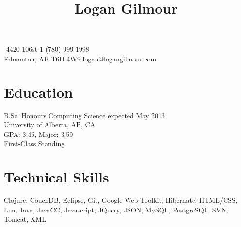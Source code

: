 \documentclass[10pt]{article}
\title{\bfseries\Large Logan Gilmour}
\author{}
\date{}
\begin{document}
\maketitle
{}-4420 106st \hfill 1 (780) 999-1998\\
Edmonton, AB  T6H 4W9 \hfill logan@logangilmour.com
\section*{Education}
B.Sc. Honours Computing Science expected May 2013\\
University of Alberta, AB, CA\\
GPA: 3.45, Major: 3.59\\
First-Class Standing



\section*{Technical Skills}
Clojure, CouchDB, Eclipse, Git, Google Web Toolkit, Hibernate, HTML/CSS, Lua, Java, JavaCC, Javascript, JQuery, JSON, MySQL, PostgreSQL, SVN, Tomcat, XML
\end{document}
